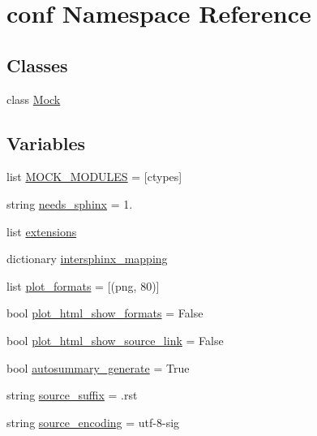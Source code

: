\hypertarget{namespaceconf}{}\section{conf Namespace Reference}
\label{namespaceconf}
\subsection*{Classes}
\begin{DoxyCompactItemize}
\item 
class \mbox{\hyperlink{classconf_1_1Mock}{Mock}}
\end{DoxyCompactItemize}
\subsection*{Variables}
\begin{DoxyCompactItemize}
\item 
list \mbox{\hyperlink{namespaceconf_aa0ec3e2d302f8100428e8ffcf81824b6}{M\+O\+C\+K\+\_\+\+M\+O\+D\+U\+L\+ES}} = \mbox{[}\textquotesingle{}ctypes\textquotesingle{}\mbox{]}
\item 
string \mbox{\hyperlink{namespaceconf_aef248bfd8ae35066df58d3c76b62cf85}{needs\+\_\+sphinx}} = \textquotesingle{}1.\textquotesingle{}
\item 
list \mbox{\hyperlink{namespaceconf_a540efa67c53e84c1c353c1df2e37e39c}{extensions}}
\item 
dictionary \mbox{\hyperlink{namespaceconf_a9d1981d8fc4e2521d62ffc607e3ef8f2}{intersphinx\+\_\+mapping}}
\item 
list \mbox{\hyperlink{namespaceconf_adbde6e4ba4ea4a0e49f91458929d4ec1}{plot\+\_\+formats}} = \mbox{[}(\textquotesingle{}png\textquotesingle{}, 80)\mbox{]}
\item 
bool \mbox{\hyperlink{namespaceconf_a953a1915c76b23257b6da9b0570fdac3}{plot\+\_\+html\+\_\+show\+\_\+formats}} = False
\item 
bool \mbox{\hyperlink{namespaceconf_a230c2b8e1398043e7bc962837bff24e9}{plot\+\_\+html\+\_\+show\+\_\+source\+\_\+link}} = False
\item 
bool \mbox{\hyperlink{namespaceconf_a8e6ca51af260afe85dcd1f84fff99bdf}{autosummary\+\_\+generate}} = True
\item 
string \mbox{\hyperlink{namespaceconf_a1e0ba7f4cb1d50fa831f1236a77d60f6}{source\+\_\+suffix}} = \textquotesingle{}.rst\textquotesingle{}
\item 
string \mbox{\hyperlink{namespaceconf_a0351dbdb53332ca016dc128fe3583e76}{source\+\_\+encoding}} = \textquotesingle{}utf-\/8-\/sig\textquotesingle{}

\end{DoxyCompactItemize}
